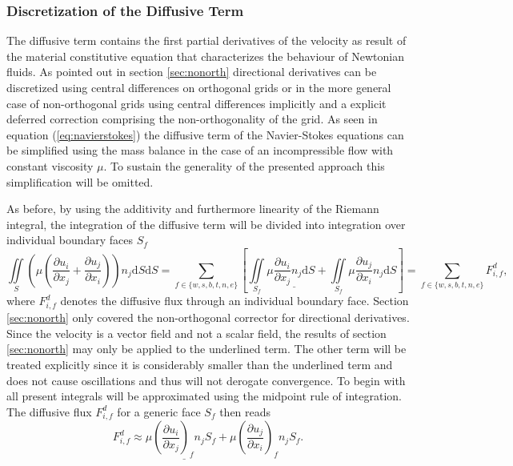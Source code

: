       \subsubsection{Discretization of the Diffusive Term}

      The diffusive term contains the first partial derivatives of the velocity as result of the material constitutive equation that characterizes the behaviour of Newtonian fluids. As pointed out in section \ref{sec:nonorth} directional derivatives can be discretized using central differences on orthogonal grids or in the more general case of non-orthogonal grids using central differences implicitly and a explicit deferred correction comprising the non-orthogonality of the grid. As seen in equation (\ref{eq:navierstokes}) the diffusive term of the Navier-Stokes equations can be simplified using the mass balance in the case of an incompressible flow with constant viscosity \(\mu\). To sustain the generality of the presented approach this simplification will be omitted.

      As before, by using the additivity and furthermore linearity of the Riemann integral, the integration of the diffusive term will be divided into integration over individual boundary faces \(S_f\) 
      \begin{displaymath}
      \iint\limits_S \left(\mu \left( \frac{\partial u_i}{\partial x_j} + \frac{\partial u_j}{\partial x_i}\right)\right)n_j \mathrm{d}S \mathrm{d}S
      = \sum_{f \in \{w,s,b,t,n,e\}} \left[
        \iint\limits_{S_f} \mu \underline{\frac{\partial u_i}{\partial x_j}n_j \mathrm{d}S}
    + \iint\limits_{S_f} \mu \frac{\partial u_j}{\partial x_i}n_j \mathrm{d}S \right]
       = \sum_{f \in \{w,s,b,t,n,e\}} F_{i,f}^{d},
      \end{displaymath}
      where \(F_{i,f}^{d}\) denotes the diffusive flux through an individual boundary face. Section \ref{sec:nonorth} only covered the non-orthogonal corrector for directional derivatives. Since the velocity is a vector field and not a scalar field, the results of section \ref{sec:nonorth} may only be applied to the underlined term. The other term will be treated explicitly since it is considerably smaller than the underlined term and does not cause oscillations and thus will not derogate convergence. To begin with all present integrals will be approximated using the midpoint rule of integration. The diffusive flux \(F_{i,f}^d\) for a generic face \(S_f\) then reads 
      \begin{displaymath}
        F_{i,f}^d \approx \mu \underline{\left(\frac{\partial u_i}{\partial x_j}\right)_f n_j S_f} + \mu \left(\frac{\partial u_j}{\partial x_i}\right)_f n_j S_f.
      \end{displaymath}

